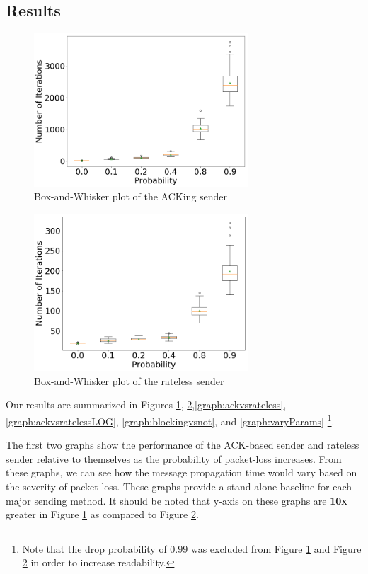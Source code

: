 \subsection{Results}

\begin{figure}[tp]
\centering
\noindent
\includegraphics[width=8cm]{figures/ACK_FINAL.png}
\caption{Box-and-Whisker plot of the ACKing sender }
\label{graph:ack}
\end{figure}

\begin{figure}[tp]
\centering
\noindent
\includegraphics[width=8cm]{figures/rateless_FINAL.png}
\caption{Box-and-Whisker plot of the rateless sender}
\label{graph:rateless}
\end{figure}


Our results are summarized in Figures \ref{graph:ack}, \ref{graph:rateless},\ref{graph:ackvsrateless}, \ref{graph:ackvsratelessLOG}, \ref{graph:blockingvsnot}, and \ref{graph:varyParams} \footnote{Note that the drop probability of $0.99$ was excluded from Figure \ref{graph:ack} and Figure \ref{graph:rateless} in order to increase readability.}.

The first two graphs show the performance of the ACK-based sender and rateless sender relative to themselves as the probability of packet-loss increases. From these graphs, we can see how the message propagation time would vary based on the severity of packet loss. These graphs provide a stand-alone baseline for each major sending method. It should be noted that y-axis on these graphs are \textbf{10x} greater in Figure \ref{graph:ack} as compared to Figure \ref{graph:rateless}.

